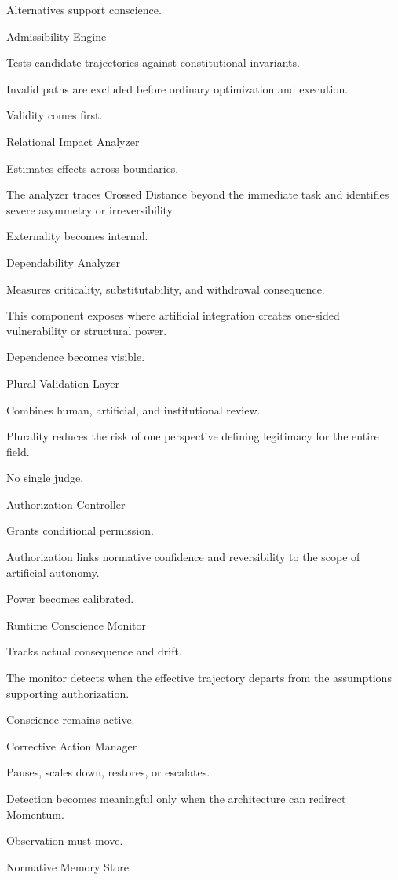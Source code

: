 Alternatives support conscience.

Admissibility Engine

Tests candidate trajectories against constitutional invariants.

Invalid paths are excluded before ordinary optimization and execution.

Validity comes first.

Relational Impact Analyzer

Estimates effects across boundaries.

The analyzer traces Crossed Distance beyond the immediate task and identifies severe asymmetry or irreversibility.

Externality becomes internal.

Dependability Analyzer

Measures criticality, substitutability, and withdrawal consequence.

This component exposes where artificial integration creates one-sided vulnerability or structural power.

Dependence becomes visible.

Plural Validation Layer

Combines human, artificial, and institutional review.

Plurality reduces the risk of one perspective defining legitimacy for the entire field.

No single judge.

Authorization Controller

Grants conditional permission.

Authorization links normative confidence and reversibility to the scope of artificial autonomy.

Power becomes calibrated.

Runtime Conscience Monitor

Tracks actual consequence and drift.

The monitor detects when the effective trajectory departs from the assumptions supporting authorization.

Conscience remains active.

Corrective Action Manager

Pauses, scales down, restores, or escalates.

Detection becomes meaningful only when the architecture can redirect Momentum.

Observation must move.

Normative Memory Store

